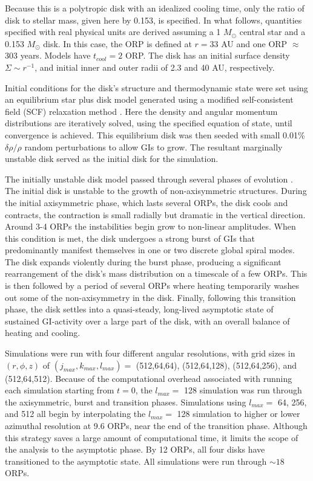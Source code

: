 \documentclass[manuscript]{aastex}
\begin{document}
Because this is a polytropic disk with an idealized cooling time, only the ratio of disk to stellar mass, given here by 0.153, is specified.  In what follows, quantities specified with real physical units are derived assuming a 1 $M_\odot$ central star and a 0.153  $M_\odot$ disk. In this case, the ORP is defined at $r = 33$ AU and one ORP $\approx$ 303 years.  Models have $t_{cool} = 2$ ORP. The disk has an initial surface density $\Sigma \sim r^{ -1}$, and initial inner and outer radii of 2.3 and 40 AU, respectively.  

Initial conditions for the disk's structure and thermodynamic state were set using an equilibrium star plus disk model generated using a modified \citet{hachisu1986} self-consistent field (SCF) relaxation method \citep{pickett1996,pickett2003,mejiaphd2004,mejia2005,cai2006}. Here  the density and angular momentum distributions are iteratively solved, using the specified equation of state,  until convergence is achieved. This  equilibrium disk was then seeded with small 0.01\% $\delta\rho/\rho$ random perturbations to allow GIs to grow.  The resultant marginally unstable disk served as the initial disk for the simulation.

The initially unstable disk model passed through several phases of evolution \citep[see also][]{pickett2003, mejia2005}.  The initial disk is unstable to the growth of non-axisymmetric structures. During the initial axisymmetric phase, 
which lasts several ORPs, the disk cools and contracts, the contraction is small radially but dramatic in the vertical direction. Around 3-4 ORPs the instabilities begin grow to non-linear amplitudes. When this condition is met, the disk undergoes a strong burst of GIs that predominantly manifest themselves in one or two discrete global spiral modes.  The disk expands violently during the burst phase, producing a significant rearrangement of the disk's mass distribution on a timescale of a few ORPs. This is then followed by a period of several ORPs where heating temporarily washes out some of the non-axisymmetry in the disk.  Finally, following this transition phase, the disk settles into a quasi-steady, long-lived asymptotic state of sustained GI-activity over a large part of the disk, with an overall balance of heating and cooling.

Simulations were run with four different angular resolutions, with grid sizes in $(r,\phi,z)$ of  $(j_{max}, k_{max}, l_{max}) =$ (512,64,64), (512,64,128), (512,64,256), and (512,64,512). Because of the computational overhead associated with running each simulation starting from $t = 0$, the $l_{max} =$ 128 simulation was run through the axisymmetric, burst and transition phases. Simulations using $l_{max} =$ 64, 256, and 512 all begin by interpolating the $l_{max} =$ 128 simulation to higher or lower azimuthal resolution at 9.6 ORPs, near the end of the transition
phase. Although this strategy saves a large amount of computational time, it limits the scope of the analysis to the asymptotic phase. By 12 ORPs, all four disks have transitioned to the asymptotic state.  All simulations were 
run through $\sim 18$ ORPs.
\end{document}
